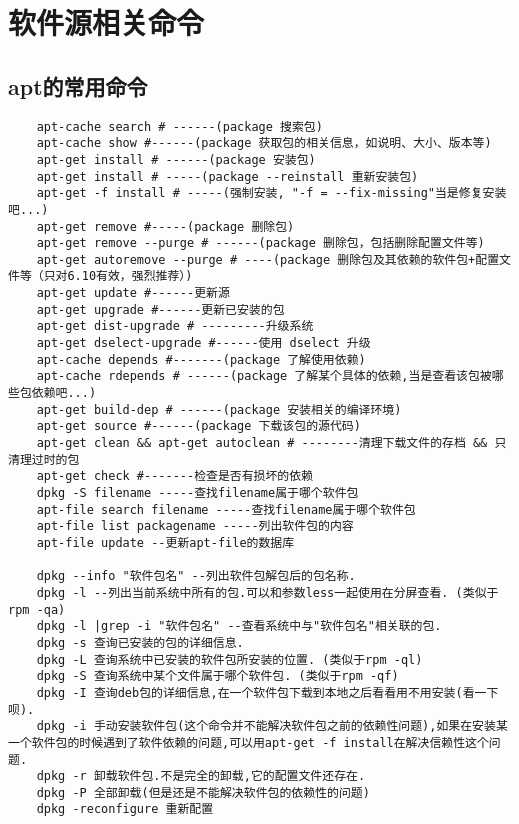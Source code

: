 \documentclass[a4paper,left=1.5cm,right=1.5cm,11pt]{article}
\begin{document}
\tableofcontents

\clearpage


\section{软件源相关命令}

\subsection{apt的常用命令}
\begin{lstlisting}
	apt-cache search # ------(package 搜索包)
	apt-cache show #------(package 获取包的相关信息，如说明、大小、版本等)
	apt-get install # ------(package 安装包)
	apt-get install # -----(package --reinstall 重新安装包)
	apt-get -f install # -----(强制安装, "-f = --fix-missing"当是修复安装吧...)
	apt-get remove #-----(package 删除包)
	apt-get remove --purge # ------(package 删除包，包括删除配置文件等)
	apt-get autoremove --purge # ----(package 删除包及其依赖的软件包+配置文件等（只对6.10有效，强烈推荐）)
	apt-get update #------更新源
	apt-get upgrade #------更新已安装的包
	apt-get dist-upgrade # ---------升级系统
	apt-get dselect-upgrade #------使用 dselect 升级
	apt-cache depends #-------(package 了解使用依赖)
	apt-cache rdepends # ------(package 了解某个具体的依赖,当是查看该包被哪些包依赖吧...)
	apt-get build-dep # ------(package 安装相关的编译环境)
	apt-get source #------(package 下载该包的源代码)
	apt-get clean && apt-get autoclean # --------清理下载文件的存档 && 只清理过时的包
	apt-get check #-------检查是否有损坏的依赖
	dpkg -S filename -----查找filename属于哪个软件包
	apt-file search filename -----查找filename属于哪个软件包
	apt-file list packagename -----列出软件包的内容
	apt-file update --更新apt-file的数据库

	dpkg --info "软件包名" --列出软件包解包后的包名称.
	dpkg -l --列出当前系统中所有的包.可以和参数less一起使用在分屏查看. (类似于rpm -qa)
	dpkg -l |grep -i "软件包名" --查看系统中与"软件包名"相关联的包.
	dpkg -s 查询已安装的包的详细信息.
	dpkg -L 查询系统中已安装的软件包所安装的位置. (类似于rpm -ql)
	dpkg -S 查询系统中某个文件属于哪个软件包. (类似于rpm -qf)
	dpkg -I 查询deb包的详细信息,在一个软件包下载到本地之后看看用不用安装(看一下呗).
	dpkg -i 手动安装软件包(这个命令并不能解决软件包之前的依赖性问题),如果在安装某一个软件包的时候遇到了软件依赖的问题,可以用apt-get -f install在解决信赖性这个问题.
	dpkg -r 卸载软件包.不是完全的卸载,它的配置文件还存在.
	dpkg -P 全部卸载(但是还是不能解决软件包的依赖性的问题)
	dpkg -reconfigure 重新配置
\end{lstlisting}
\end{document}
